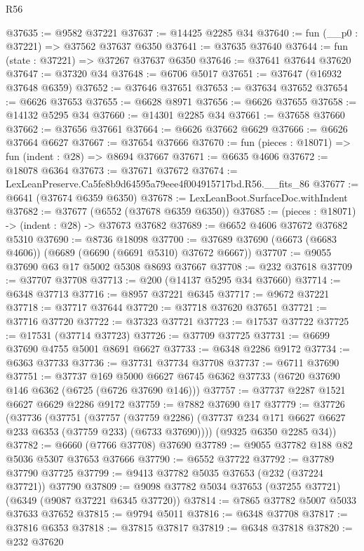 \begin{lexlean}{R56}
\begin{coremodule}
@37635 := @9582 @37221
@37637 := @14425 @2285 @34
@37640 := fun (__p0 : @37221) => @37562 @37637 @6350
@37641 := @37635 @37640
@37644 := fun (state : @37221) => @37267 @37637 @6350
@37646 := @37641 @37644 @37620
@37647 := @37320 @34
@37648 := @6706 @5017
@37651 := @37647 (@16932 @37648 @6359)
@37652 := @37646 @37651
@37653 := @37634 @37652
@37654 := @6626 @37653
@37655 := @6628 @8971
@37656 := @6626 @37655
@37658 := @14132 @5295 @34
@37660 := @14301 @2285 @34
@37661 := @37658 @37660
@37662 := @37656 @37661
@37664 := @6626 @37662 @6629
@37666 := @6626 @37664 @6627
@37667 := @37654 @37666
@37670 := fun (pieces : @18071) => fun (indent : @28) => @8694 @37667
@37671 := @6635 @4606
@37672 := @18078 @6364
@37673 := @37671 @37672
@37674 := LexLeanPreserve.Ca5fe8b9d64595a79eee4f004915717bd.R56.__fits_86
@37677 := @6641 (@37674 @6359 @6350)
@37678 := LexLeanBoot.SurfaceDoc.withIndent
@37682 := @37677 (@6552 (@37678 @6359 @6350))
@37685 := (pieces : @18071) -> (indent : @28) -> @37673 @37682
@37689 := @6652 @4606 @37672 @37682 @5310
@37690 := @8736 @18098
@37700 := @37689 @37690 (@6673 (@6683 @4606)) (@6689 (@6690 (@6691 @5310) @37672 @6667))
@37707 := @9055 @37690 @63 @17 @5002 @5308 @8693 @37667
@37708 := @232 @37618
@37709 := @37707 @37708
@37713 := @200 (@14137 @5295 @34 @37660)
@37714 := @6348 @37713
@37716 := @8957 @37221 @6345
@37717 := @9672 @37221
@37718 := @37717 @37644
@37720 := @37718 @37620 @37651
@37721 := @37716 @37720
@37722 := @37323 @37721
@37723 := @17537 @37722
@37725 := @17531 (@37714 @37723)
@37726 := @37709 @37725
@37731 := @6699 @37690 @4755 @5001 @8691 @6627
@37733 := @6348 @2286 @9172
@37734 := @6363 @37733
@37736 := @37731 @37734 @37708
@37737 := @6711 @37690
@37751 := @37737
    @169
    @5000
    @6627
    @6745
    @6362
    @37733
    (@6720 @37690 @146 @6362 (@6725 (@6726 @37690 @146)))
@37757 := @37737 @2287 @1521 @6627 @6629 @2286 @9172
@37759 := @7882 @37690 @17
@37779 := @37726
    (@37736
      (@37751
        (@37757
          (@37759 @2286)
          (@37737 @234 @171 @6627 @6627 @233 @6353 (@37759 @233) (@6733 @37690))))
      (@9325 @6350 @2285 @34))
@37782 := @6660 (@7766 @37708) @37690
@37789 := @9055 @37782 @188 @82 @5036 @5307 @37653 @37666
@37790 := @6552 @37722
@37792 := @37789 @37790 @37725
@37799 := @9413 @37782 @5035 @37653 (@232 (@37224 @37721)) @37790
@37809 := @9098 @37782 @5034 @37653 (@37255 @37721) (@6349 (@9087 @37221 @6345 @37720))
@37814 := @7865 @37782 @5007 @5033 @37633 @37652
@37815 := @9794 @5011
@37816 := @6348 @37708
@37817 := @37816 @6353
@37818 := @37815 @37817
@37819 := @6348 @37818
@37820 := @232 @37620

\end{coremodule}
\end{lexlean}
